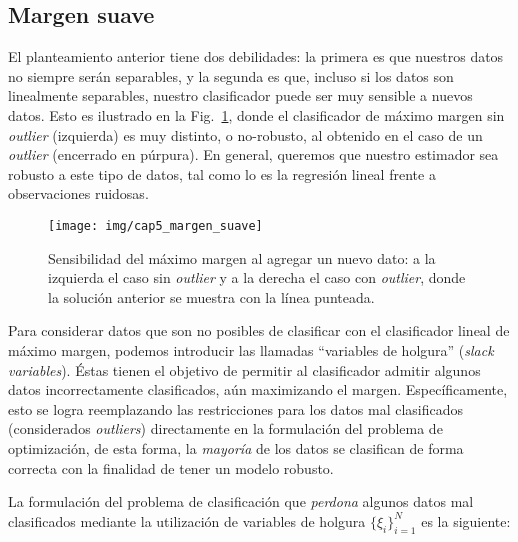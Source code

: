 \noindent{}


\subsection{Margen suave}

El planteamiento anterior tiene dos debilidades: la primera es que nuestros datos no siempre serán separables, y la segunda es que, incluso si los datos son linealmente separables, nuestro clasificador puede ser muy sensible a nuevos datos. Esto es ilustrado en la Fig.~\ref{fig:svm_softmargin}, donde el clasificador de máximo margen sin \emph{outlier} (izquierda) es muy distinto, o no-robusto, al obtenido en el caso de un \emph{outlier} (encerrado en púrpura). En general, queremos que nuestro estimador sea robusto a este tipo de datos, tal como lo es la regresión lineal frente a observaciones ruidosas. 

\begin{figure}[ht]
    \centering
    \texttt{[image: img/cap5\_margen\_suave]}
    \caption{Sensibilidad del máximo margen al agregar un nuevo dato: a la izquierda el caso sin \emph{outlier} y a la derecha el caso con \emph{outlier}, donde la solución anterior se muestra con la línea punteada.}
    \label{fig:svm_softmargin}
\end{figure}

Para considerar datos que son no posibles de clasificar con el clasificador lineal de máximo margen, podemos introducir las llamadas ``variables de holgura'' (\emph{slack variables}). Éstas tienen el objetivo de permitir al clasificador admitir algunos datos incorrectamente clasificados, aún maximizando el margen. Específicamente, esto se logra reemplazando las restricciones para los datos mal clasificados (considerados \emph{outliers}) directamente en la formulación del problema de optimización, de esta forma, la \textit{mayoría} de los datos se clasifican de forma correcta con la finalidad de tener un modelo robusto.

La formulación del problema de clasificación que \emph{perdona} algunos datos mal clasificados mediante la utilización de variables de holgura $\{\xi_i\}_{i=1}^N$ es la siguiente:

